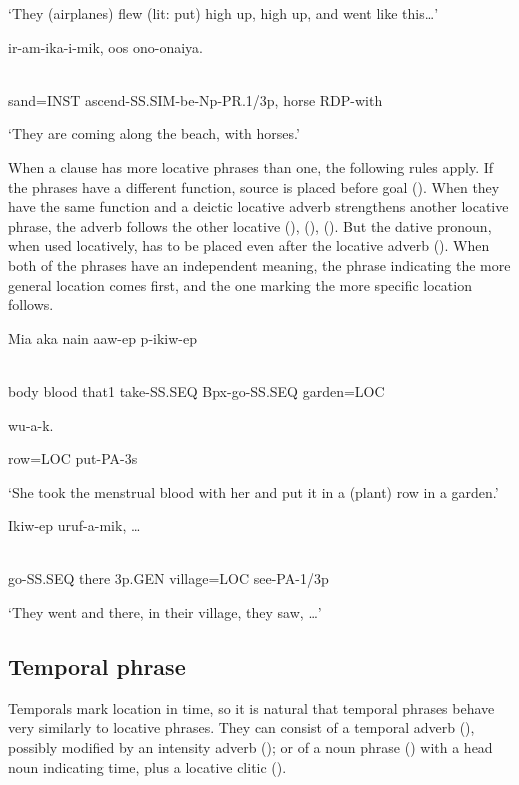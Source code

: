 `They (airplanes) flew (lit: put) high up, high up, and went like this{\dots}'

\ea%
\label{ex:x867}
\gll {}  ir-am-ika-i-mik,  oos  ono-onaiya. \\
      \\
\glt
\z

sand=INST  ascend-SS.SIM-be-Np-PR.1/3p,  horse  RDP-with

`They are coming along the beach, with horses.'

When a clause has more locative phrases than one, the following rules apply. If  the phrases have a different function, source is placed before goal (). When they have the same function and a deictic locative adverb strengthens another locative phrase, the adverb follows the other locative (), (), (). But  the dative pronoun, when used locatively, has to be placed even after the locative adverb (). When both of the phrases have an independent meaning, the phrase indicating the more general location comes first, and the one marking the more specific location follows.

\ea%
\label{ex:x868}
\gll Mia  aka  nain  aaw-ep  p-ikiw-ep   \\
      \\
\glt
\z

body  blood  that1  take-SS.SEQ  Bpx-go-SS.SEQ  garden=LOC  

  wu-a-k.

row=LOC  put-PA-3s

`She took the menstrual blood with her and put it in a (plant) row in a garden.'

\ea%
\label{ex:x869}
\gll Ikiw-ep    uruf-a-mik,  {\dots }\\
      \\
\glt
\z

go-SS.SEQ  there  3p.GEN  village=LOC  see-PA-1/3p

`They went and there, in their village, they saw, {\dots}'

\subsection{Temporal phrase}
{}
Temporals mark location in time, so it is natural that temporal phrases behave very similarly to locative phrases.  They can consist of a temporal adverb (), possibly modified by an intensity adverb (); or of a noun phrase () with a head noun indicating time, plus a locative clitic ().

